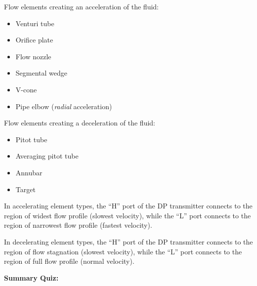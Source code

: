 












Flow elements creating an acceleration of the fluid:

\begin{itemize}
\item{} Venturi tube
\item{} Orifice plate
\item{} Flow nozzle
\item{} Segmental wedge
\item{} V-cone
\item{} Pipe elbow ({\it radial} acceleration)
\end{itemize}

\vskip 10pt

Flow elements creating a deceleration of the fluid:

\begin{itemize}
\item{} Pitot tube
\item{} Averaging pitot tube
\item{} Annubar
\item{} Target
\end{itemize}

\vskip 10pt

In accelerating element types, the ``H'' port of the DP transmitter connects to the region of widest flow profile (slowest velocity), while the ``L'' port connects to the region of narrowest flow profile (fastest velocity).

\vskip 10pt

In decelerating element types, the ``H'' port of the DP transmitter connects to the region of flow stagnation (slowest velocity), while the ``L'' port connects to the region of full flow profile (normal velocity).





\vfil \eject

\noindent
{\bf Summary Quiz:}


